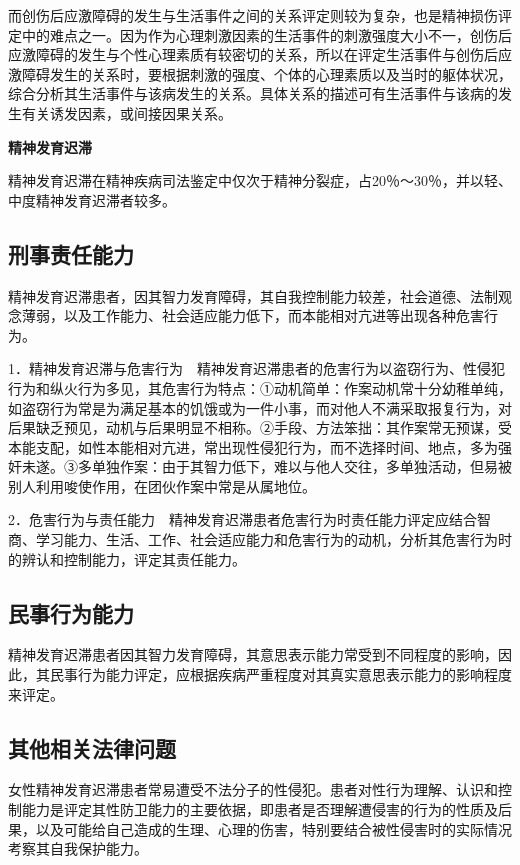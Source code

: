 而创伤后应激障碍的发生与生活事件之间的关系评定则较为复杂，也是精神损伤评定中的难点之一。因为作为心理刺激因素的生活事件的刺激强度大小不一，创伤后应激障碍的发生与个性心理素质有较密切的关系，所以在评定生活事件与创伤后应激障碍发生的关系时，要根据刺激的强度、个体的心理素质以及当时的躯体状况，综合分析其生活事件与该病发生的关系。具体关系的描述可有生活事件与该病的发生有关诱发因素，或间接因果关系。

\textbf{精神发育迟滞}

精神发育迟滞在精神疾病司法鉴定中仅次于精神分裂症，占20％～30％，并以轻、中度精神发育迟滞者较多。

\subsection{刑事责任能力}

精神发育迟滞患者，因其智力发育障碍，其自我控制能力较差，社会道德、法制观念薄弱，以及工作能力、社会适应能力低下，而本能相对亢进等出现各种危害行为。

1．精神发育迟滞与危害行为　精神发育迟滞患者的危害行为以盗窃行为、性侵犯行为和纵火行为多见，其危害行为特点：①动机简单：作案动机常十分幼稚单纯，如盗窃行为常是为满足基本的饥饿或为一件小事，而对他人不满采取报复行为，对后果缺乏预见，动机与后果明显不相称。②手段、方法笨拙：其作案常无预谋，受本能支配，如性本能相对亢进，常出现性侵犯行为，而不选择时间、地点，多为强奸未遂。③多单独作案：由于其智力低下，难以与他人交往，多单独活动，但易被别人利用唆使作用，在团伙作案中常是从属地位。

2．危害行为与责任能力　精神发育迟滞患者危害行为时责任能力评定应结合智商、学习能力、生活、工作、社会适应能力和危害行为的动机，分析其危害行为时的辨认和控制能力，评定其责任能力。

\subsection{民事行为能力}

精神发育迟滞患者因其智力发育障碍，其意思表示能力常受到不同程度的影响，因此，其民事行为能力评定，应根据疾病严重程度对其真实意思表示能力的影响程度来评定。

\subsection{其他相关法律问题}

女性精神发育迟滞患者常易遭受不法分子的性侵犯。患者对性行为理解、认识和控制能力是评定其性防卫能力的主要依据，即患者是否理解遭侵害的行为的性质及后果，以及可能给自己造成的生理、心理的伤害，特别要结合被性侵害时的实际情况考察其自我保护能力。

